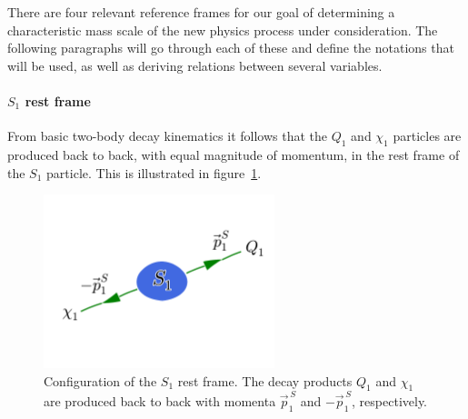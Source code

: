 There are four relevant reference frames for our goal of determining a characteristic mass scale
of the new physics process under consideration. The following paragraphs will go through each of
these and define the notations that will be used, as well as deriving relations between several
variables. 

\paragraph{$S_1$ rest frame} 
From basic two-body decay kinematics it follows that the $Q_1$ and $\chi_1$ particles are produced
back to back, with equal magnitude of momentum, in the rest frame of the $S_1$ particle. This is
illustrated in figure~\ref{fig:razor_S1_rest_frame}. 

\begin{figure}[htpb]
  \centering
  \includegraphics[width=0.6\textwidth,clip=true,trim=0 4cm 0
3cm]{figures/razor_variables/rest_frame}
  \caption{Configuration of the $S_1$ rest frame. The decay products $Q_1$ and $\chi_1$ are
produced back to back with momenta $\vec{p}^{\,S}_1$ and $-\vec{p}^{\,S}_1$, respectively. 
\label{fig:razor_S1_rest_frame}}
\end{figure}

